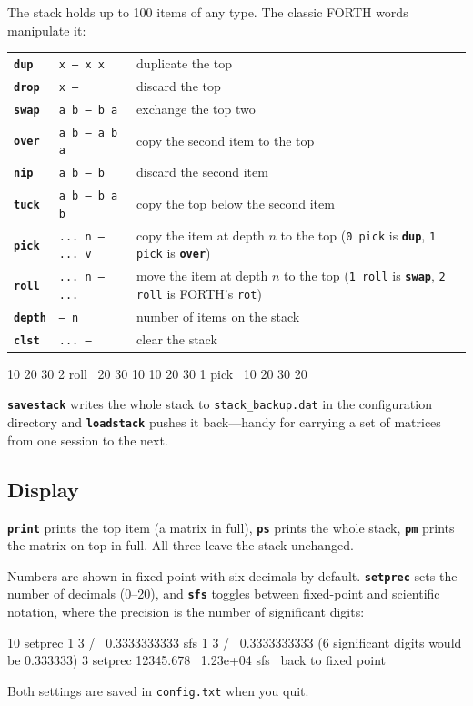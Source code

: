 \documentclass[11pt,letterpaper]{article}
\newcommand{\code}[1]{\texttt{#1}}
\newcommand{\cmd}[1]{\texttt{\textbf{#1}}}
\newcommand{\stk}[1]{\texttt{#1}}
\begin{document}
The stack holds up to 100 items of any type. The classic FORTH words manipulate it:

\begin{center}
\begin{tabular}{@{}llp{}@{}}
\toprule
\cmd{dup}  & \stk{x -- x x}     & duplicate the top \\
\cmd{drop} & \stk{x --}         & discard the top \\
\cmd{swap} & \stk{a b -- b a}   & exchange the top two \\
\cmd{over} & \stk{a b -- a b a} & copy the second item to the top \\
\cmd{nip}  & \stk{a b -- b}     & discard the second item \\
\cmd{tuck} & \stk{a b -- b a b} & copy the top below the second item \\
\cmd{pick} & \stk{... n -- ... v} & copy the item at depth $n$ to the top (\code{0 pick} is \cmd{dup}, \code{1 pick} is \cmd{over}) \\
\cmd{roll} & \stk{... n -- ...}   & move the item at depth $n$ to the top (\code{1 roll} is \cmd{swap}, \code{2 roll} is FORTH's \code{rot}) \\
\cmd{depth} & \stk{-- n}        & number of items on the stack \\
\cmd{clst} & \stk{... --}       & clear the stack \\
\bottomrule
\end{tabular}
\end{center}

\begin{rpn}
10 20 30 2 roll     \ 20 30 10
10 20 30 1 pick     \ 10 20 30 20
\end{rpn}

\cmd{savestack} writes the whole stack to \code{stack\_backup.dat} in the configuration directory and \cmd{loadstack} pushes it back---handy for carrying a set of matrices from one session to the next.

\subsection{Display}

\cmd{print} prints the top item (a matrix in full), \cmd{ps} prints the whole stack, \cmd{pm} prints the matrix on top in full. All three leave the stack unchanged.

Numbers are shown in fixed-point with six decimals by default. \cmd{setprec} sets the number of decimals (0--20), and \cmd{sfs} toggles between fixed-point and scientific notation, where the precision is the number of significant digits:
\begin{rpn}
10 setprec 1 3 /      \ 0.3333333333
sfs 1 3 /             \ 0.3333333333  (6 significant digits would be 0.333333)
3 setprec 12345.678   \ 1.23e+04
sfs                   \ back to fixed point
\end{rpn}
Both settings are saved in \code{config.txt} when you quit.
\end{document}
